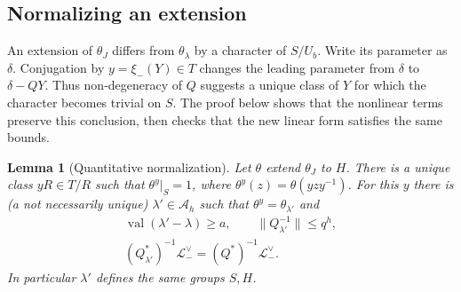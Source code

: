 \documentclass[11pt,reqno]{amsart}
\numberwithin{equation}{section}
\theoremstyle{plain}
\newtheorem{lemma}[theorem]{Lemma}
\theoremstyle{definition}
\theoremstyle{remark}
\theoremstyle{plain}
\newcommand{\Lat}{\mathcal{L}}   %
\newcommand{\g}{\mathfrak{g}}    %
\newcommand{\norm}[1]{\lVert#1\rVert}
\DeclareMathOperator{\val}{val}
\newcommand{\lf}{\lambda}
\begin{document}
\subsection{Normalizing an extension}\label{sec:normalizationdetails}
An extension of $\theta_J$ differs from $\theta_\lf$ by a character
of $S/U_b$. Write its parameter as $\delta$. Conjugation by
$y=\xi_-(Y)\in T$ changes the leading parameter from $\delta$ to
$\delta-QY$. Thus non-degeneracy of $Q$ suggests a unique class of
$Y$ for which the character becomes trivial on $S$. The proof below
shows that the nonlinear terms preserve this conclusion, then checks
that the new linear form satisfies the same bounds.

\begin{lemma}[Quantitative normalization]\label{lem:normalizationbounds}
Let $\theta$ extend $\theta_J$ to $H$. There is a unique class
$yR\in T/R$ such that $\theta^y|_S=1$, where
$\theta^y(z)=\theta(yzy^{-1})$. For this $y$ there is (a not necessarily unique)
$\lf'\in\mathcal A_h$ such that $\theta^y=\theta_{\lf'}$ and
\begin{equation}\label{eq:Aprime}
\begin{gathered}
\val(\lf'-\lf)\ge a,\qquad
\norm{Q_{\lf'}^{-1}}\le q^h,\\
(Q_{\lf'}^*)^{-1}\Lat_-^\vee=(Q^*)^{-1}\Lat_-^\vee.
\end{gathered}
\end{equation}
In particular $\lf'$ defines the same groups $S,H$.
\end{lemma}
\end{document}
